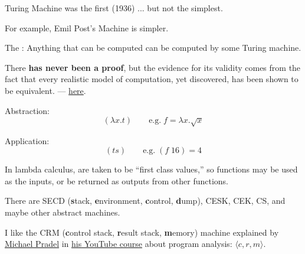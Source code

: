 \documentclass{article}
\begin{document}

\plush{}


Turing Machine was the first (1936) ... but not the simplest.


For example, Emil Post's Machine is simpler.

\plush{}


The : Anything that can be computed can be computed by some Turing machine.

There \textbf{has never been a proof}, but the evidence for its validity comes from the fact that every realistic model of computation, yet discovered, has been shown to be equivalent. --- \href{https://mathworld.wolfram.com/Church-TuringThesis.html}{here}.

\plush{}


Abstraction:
\begin{equation*}
(\lambda x . t)\quad\quad \text{e.g.}\; f = \lambda x . \sqrt{x}
\end{equation*}

Application:
\begin{equation*}
(t s)\quad\quad \text{e.g.}\; (f\;16) = 4
\end{equation*}

In lambda calculus,  are taken to be ``first class values,''
so functions may be used as the inputs, or be returned as outputs from other functions.

\plush{}


There are SECD (\textbf{s}tack, \textbf{e}nvironment, \textbf{c}ontrol, \textbf{d}ump),
CESK, CEK, CS, and maybe other abstract machines.

I like the CRM (\textbf{c}ontrol stack, \textbf{r}esult stack, \textbf{m}emory) machine explained by
\href{https://software-lab.org/people/Michael_Pradel.html}{Michael Pradel} in
\href{https://www.youtube.com/watch?v=YRfb2zDk_qs}{his YouTube course} about program analysis:
$\langle c, r, m\rangle$.
\end{document}
